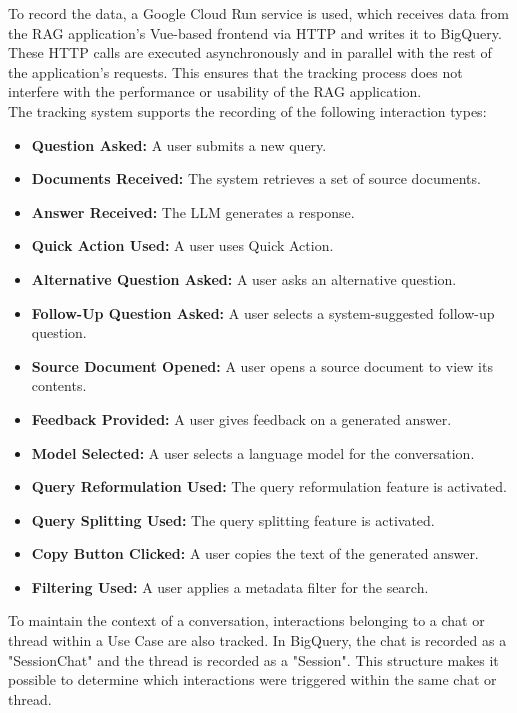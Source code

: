 \documentclass[
	english,
	ruledheaders=section,%
	class=report,%
	thesis={type=bachelor},%
	accentcolor=1b,%
	custommargins=true,%
	marginpar=false,%
	parskip=half-,%
	fontsize=11pt,%
	DIV=14,
]{tudapub}
\begin{document}
To record the data, a Google Cloud Run service \parencite{GoogleCloudRunService} is used, which receives data from the RAG application's Vue-based \parencite{vuejs} frontend via HTTP and writes it to BigQuery. These HTTP calls are executed asynchronously and in parallel with the rest of the application's requests. This ensures that the tracking process does not interfere with the performance or usability of the RAG application.
\\
The tracking system supports the recording of the following interaction types:
\begin{itemize}
    \item \textbf{Question Asked:} A user submits a new query.
    \item \textbf{Documents Received:} The system retrieves a set of source documents.
    \item \textbf{Answer Received:} The LLM generates a response.
    \item \textbf{Quick Action Used:} A user uses Quick Action.
    \item \textbf{Alternative Question Asked:} A user asks an alternative question.
    \item \textbf{Follow-Up Question Asked:} A user selects a system-suggested follow-up question.
    \item \textbf{Source Document Opened:} A user opens a source document to view its contents.
    \item \textbf{Feedback Provided:} A user gives feedback on a generated answer.
    \item \textbf{Model Selected:} A user selects a language model for the conversation.
    \item \textbf{Query Reformulation Used:} The query reformulation feature is activated.
    \item \textbf{Query Splitting Used:} The query splitting feature is activated.
    \item \textbf{Copy Button Clicked:} A user copies the text of the generated answer.
    \item \textbf{Filtering Used:} A user applies a metadata filter for the search.
\end{itemize}
To maintain the context of a conversation, interactions belonging to a chat or thread within a Use Case are also tracked. In BigQuery, the chat is recorded as a "SessionChat" and the thread is recorded as a "Session". This structure makes it possible to determine which interactions were triggered within the same chat or thread.
\end{document}
